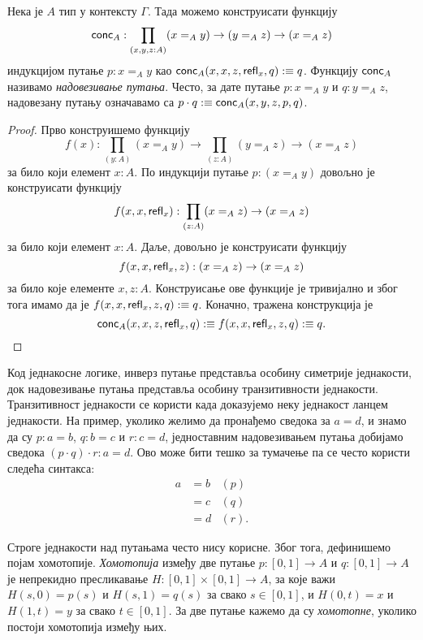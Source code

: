 \documentclass[12pt,oneside]{memoir}
\begin{document}
\begin{lemma}
    \label{lmm:comp}
    Нека је $A$ тип у контексту $\Gamma$. Тада можемо конструисати функцију \[\mathsf{conc}_{A} : \prod_{(x, y, z : A)} (x =_A y) \to (y =_A z) \to (x =_A z)\] индукцијом путање $p : x =_A y$ као $\mathsf{conc}_{A} (x, x, z, \mathsf{refl}_{x}, q) :\equiv q$. Функцију $\mathsf{conc}_{A}$ називамо \emph{надовезивање путања}. Често, за дате путање $p : x =_A y$ и $q : y =_A z$, надовезану путању означавамо са $p \cdot q :\equiv \mathsf{conc}_{A} (x, y, z, p, q)$.
\end{lemma}
\begin{proof}
    Прво конструишемо функцију
    \[f(x) : \prod_{(y : A)} (x =_A y) \to \prod_{(z : A)} (y =_A z) \to (x =_A z)\] за било који елемент $x : A$. По индукцији путање $p : (x =_A y)$ довољно је конструисати функцију \[ f(x, x, \mathsf{refl}_{x}) : \prod_{(z : A)} (x =_A z) \to (x =_A z) \] за било који елемент $x : A$. Даље, довољно је конструисати функцију \[ f(x, x, \mathsf{refl}_{x}, z) : (x =_A z) \to (x =_A z) \] за било које елементе $x, z : A$. Конструисање ове функције је тривијално и због тога имамо да је $f(x, x, \mathsf{refl}_{x}, z, q) :\equiv q$. Коначно, тражена конструкција је \[\mathsf{conc}_{A}(x, x, z, \mathsf{refl}_{x}, q) :\equiv f(x, x, \mathsf{refl}_{x}, z, q) :\equiv q. \]
\end{proof}

Код једнакосне логике, инверз путање представља особину симетрије једнакости, док надовезивање путања представља особину транзитивности једнакости. Транзитивност једнакости се користи када доказујемо неку једнакост ланцем једнакости. На пример, уколико желимо да пронађемо сведока за $a = d$, и знамо да су $p : a = b$, $q : b = c$ и $r : c = d$, једноставним надовезивањем путања добијамо сведока $(p \cdot q) \cdot r : a = d$. Ово може бити тешко за тумачење па се често користи следећа синтакса:
\begin{align*}
    a &= b & (p) \\
      &= c & (q) \\
      &= d & (r).
\end{align*}

Строге једнакости над путањама често нису корисне. Због тога, дефинишемо појам хомотопије. \emph{Хомотопија} између две путање $p : [0, 1] \to A$ и $q : [0, 1] \to A$ је непрекидно пресликавање $H : [0, 1] \times [0, 1] \to A$, за које важи $H(s, 0) = p(s)$ и $H(s, 1) = q(s)$ за свако $s \in [0, 1]$, и
$H(0, t) = x$ и $H(1, t) = y$ за свако $t \in [0, 1]$. За две путање кажемо да су \emph{хомотопне}, уколико постоји хомотопија између њих.
\end{document}

